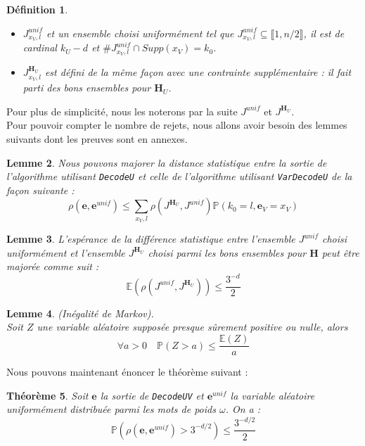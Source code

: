\documentclass[12pt]{article}
\theoremstyle{plain}
\newtheorem{thm}{Théorème}[section]
\newtheorem{lemme}[thm]{Lemme}
\newtheorem{defi}[thm]{Définition}
\newcommand{\e}{\mathbf{e}}
\begin{document}
\begin{defi}\
\begin{itemize}
\item $J_{x_V,l}^{unif}$ et un ensemble choisi uniformément tel que $J_{x_V,l}^{unif}\subseteq \llbracket 1,n/2 \rrbracket$, il est de cardinal $k_U-d$ et $\#J_{x_V,l}^{unif}\cap Supp(x_V) = k_0$. 
\item $J_{x_V, l}^{\mathbf{H}_U}$ est défini de la même façon avec une contrainte supplémentaire : il fait parti des bons ensembles pour $\mathbf{H}_U$.
\end{itemize}
\end{defi}

\noindent Pour plus de simplicité, nous les noterons par la suite $J^{unif}$ et $J^{\mathbf{H}_U}$.\\

\noindent Pour pouvoir compter le nombre de rejets, nous allons avoir besoin des lemmes suivants dont les preuves sont en annexes.

\begin{lemme}\label{maj_dist_e_eunif}
Nous pouvons majorer la distance statistique entre la sortie de l'algorithme utilisant \verb|DecodeU| et celle de l'algorithme utilisant \verb|VarDecodeU| de la façon suivante :
$$ \rho\left(\e ,\e^{unif}\right) \leq \sum\limits_{x_V,l} \rho\left(J^{\mathbf{H}_U},J^{unif}\right)\mathbb{P}\left(k_0 = l, \e_V = x_V\right) $$ 
\end{lemme}


\begin{lemme}\label{esp}
L'espérance de la différence statistique entre l'ensemble $J^{unif}$ choisi uniformément et l'ensemble $J^{\mathbf{H}_U}$ choisi parmi les bons ensembles pour $\mathbf{H}$ peut être majorée comme suit :
$$ \mathbb{E}\left(\rho\left(J^{unif},J^{\mathbf{H}_U}\right)\right) \leq \frac{3^{-d}}{2} $$
\end{lemme}

\begin{lemme}\label{markov}(Inégalité de Markov).\\
Soit $Z$ une variable aléatoire supposée presque sûrement positive ou nulle, alors $$\forall a>0\quad \mathbb{P}(Z > a) \leq \frac{\mathbb{E}(Z)}{a}$$
\end{lemme}

\noindent Nous pouvons maintenant énoncer le théorème suivant :

\begin{thm}\label{rejet}
Soit $\e$ la sortie de \verb|DecodeUV| et $\e^{unif}$ la variable aléatoire uniformément distribuée parmi les mots de poids $\omega$. On a :
$$ \mathbb{P}\left(\rho(\e,\e^{unif})>3^{-d/2}\right) \leq \frac{3^{-d/2}}{2} $$
\end{thm}
\end{document}
